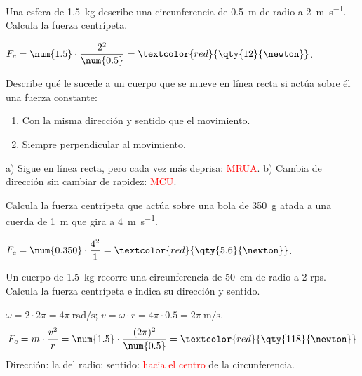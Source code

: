 \begin{exercise}
    Una esfera de \qty{1.5}{\kg} describe una circunferencia de \qty{0.5}{\m} de radio a \qty{2}{\m\per\s}. Calcula la fuerza centrípeta.
    \begin{solu}
        \(F_c = \num{1.5} \cdot \dfrac{2^2}{\num{0.5}} = \textcolor{red}{\qty{12}{\newton}}\).
    \end{solu}
\end{exercise}

\begin{exercise}
    Describe qué le sucede a un cuerpo que se mueve en línea recta si actúa sobre él una fuerza constante:
    \begin{enumerate}[label=\alph*)]
        \item Con la misma dirección y sentido que el movimiento.
        \item Siempre perpendicular al movimiento.
    \end{enumerate}
    \begin{solu}
        a) Sigue en línea recta, pero cada vez más deprisa: \textcolor{red}{MRUA}. b) Cambia de dirección sin cambiar de rapidez: \textcolor{red}{MCU}.
    \end{solu}
\end{exercise}

\begin{exercise}
    Calcula la fuerza centrípeta que actúa sobre una bola de \qty{350}{\g} atada a una cuerda de \qty{1}{\m} que gira a \qty{4}{\m\per\s}.
    \begin{solu}
        \(F_c = \num{0.350} \cdot \dfrac{4^2}{1} = \textcolor{red}{\qty{5.6}{\newton}}\).
    \end{solu}
\end{exercise}

\begin{exercise}
    Un cuerpo de \qty{1.5}{\kg} recorre una circunferencia de \qty{50}{\cm} de radio a 2 rps. Calcula la fuerza centrípeta e indica su dirección y sentido.
    \begin{solu}
        \(\omega = 2 \cdot 2\pi = 4\pi~\unit{\radian\per\s}\); \(v = \omega \cdot r = 4\pi \cdot \num{0.5} = 2\pi~\unit{\m\per\s}\).
        \[ F_c = m \cdot \frac{v^2}{r} = \num{1.5} \cdot \frac{(2\pi)^2}{\num{0.5}} = \textcolor{red}{\qty{118}{\newton}} \]
        Dirección: la del radio; sentido: \textcolor{red}{hacia el centro} de la circunferencia.
    \end{solu}
\end{exercise}

